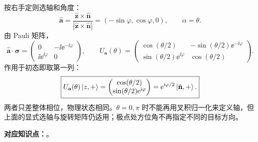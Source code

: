 \begin{checkedsolution}
按右手定则选轴和角度：
\begin{equation}
  \hat{\mathbf a}=\frac{\hat{\mathbf z}\times\hat{\mathbf n}}
     {|\hat{\mathbf z}\times\hat{\mathbf n}|}
     =(-\sin\varphi,\cos\varphi,0),\qquad \alpha=\theta.
\end{equation}
由 Pauli 矩阵，
\begin{equation}
  \hat{\mathbf a}\cdot\boldsymbol\sigma
    =\begin{pmatrix}0&-\ii\ee^{-\ii\varphi}\\
      \ii\ee^{\ii\varphi}&0\end{pmatrix},\qquad
  U_{\mathbf a}(\theta)=\begin{pmatrix}
      \cos(\theta/2)&-\sin(\theta/2)\ee^{-\ii\varphi}\\
      \sin(\theta/2)\ee^{\ii\varphi}&\cos(\theta/2)
    \end{pmatrix}.
\end{equation}
作用于初态即取第一列：
\begin{equation}
  \boxed{U_{\mathbf a}(\theta)\left|z,+\right\rangle
    =\begin{pmatrix}\cos(\theta/2)\\\sin(\theta/2)\mathrm{e}^{\mathrm{i}\varphi}\end{pmatrix}
    =\mathrm{e}^{\mathrm{i}\varphi/2}\left|\hat{\mathbf n},+\right\rangle.}
\end{equation}
两者只差整体相位，物理状态相同。$\theta=0,\pi$ 时不能再用叉积归一化来定义轴，但上面的显式选轴与旋转矩阵仍适用；极点处方位角不再指定不同的目标方向。
\end{checkedsolution}

\textbf{对应知识点：}。

